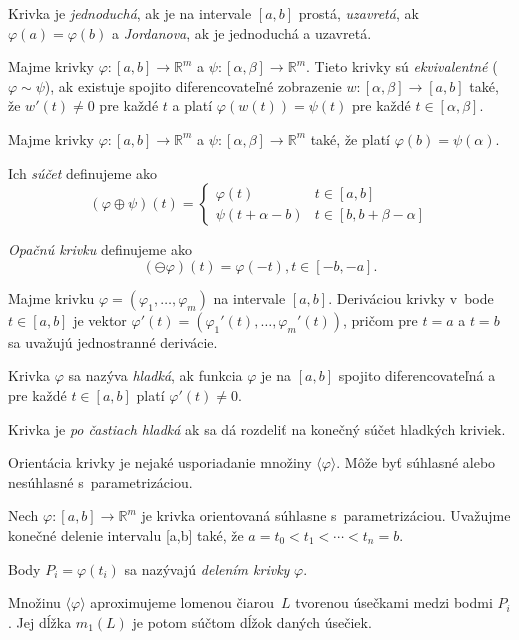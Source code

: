 Krivka je {\em jednoduchá}, ak je na intervale $[a,b]$ prostá,
{\em uzavretá}, ak $\varphi(a)=\varphi(b)$ a {\em Jordanova}, ak
je jednoduchá a uzavretá.

\begin{definition}
	Majme krivky $\varphi: [a,b] \to \mathbb{R}^m$ a 
	$\psi : [\alpha, \beta] \to \mathbb{R}^m$. Tieto krivky
	sú {\em ekvivalentné} ($\varphi \sim \psi$), ak existuje 
	spojito diferencovateľné
	zobrazenie $w : [\alpha, \beta] \to [a,b]$ také, že
	$w'(t) \neq 0$ pre každé $t$ a platí
	$\varphi(w(t)) = \psi(t)$ pre každé $t \in [\alpha, \beta]$.
\end{definition}

\begin{definition}
	Majme krivky $\varphi: [a,b] \to \mathbb{R}^m$ a 
	$\psi : [\alpha, \beta] \to \mathbb{R}^m$ také, že platí
	$\varphi(b)=\psi(\alpha)$.
	
	Ich {\em súčet} definujeme ako 
	\[
		(\varphi \oplus \psi)(t) =
		\begin{cases}
			\varphi(t) & t \in [a,b] \\
			\psi(t+\alpha-b) & t \in [b, b + \beta - \alpha]
		\end{cases}
	\]
	
	{\em Opačnú krivku} definujeme ako
	\[
		(\ominus \varphi)(t) = \varphi(-t), t \in [-b, -a].
	\]
\end{definition}

\begin{definition}
	Majme krivku $\varphi=(\varphi_1, \ldots, \varphi_m)$ na intervale
	$[a,b]$. Deriváciou krivky v~bode $t \in [a,b]$ je vektor
	$\varphi'(t) = (\varphi_1'(t), \ldots, \varphi_m'(t))$, pričom pre $t=a$
	a $t=b$ sa uvažujú jednostranné derivácie.
\end{definition}

\begin{definition}
	Krivka $\varphi$ sa nazýva {\em hladká}, ak funkcia $\varphi$
	je na $[a,b]$ spojito diferencovateľná a pre každé $t \in [a,b]$
	platí $\varphi'(t) \neq 0$.
	
	Krivka je {\em po častiach hladká} ak sa dá rozdeliť na konečný 
	súčet hladkých kriviek.
\end{definition}

Orientácia krivky je nejaké usporiadanie množiny $\langle \varphi \rangle$.
Môže byť súhlasné alebo nesúhlasné s~parametrizáciou.

\begin{definition}
	Nech $\varphi : [a,b] \to \mathbb{R}^m$ je krivka orientovaná
	súhlasne s~parametrizáciou. Uvažujme konečné delenie intervalu [a,b] také, že
	$a=t_0 < t_1 < \cdots < t_n = b$. 
	
	Body $P_i = \varphi(t_i)$ sa nazývajú {\em delením krivky} $\varphi$.
	
	Množinu $\langle \varphi \rangle$ aproximujeme lomenou čiarou~$L$
	tvorenou úsečkami medzi bodmi $P_i$. Jej dĺžka $m_1(L)$ je potom 
	súčtom dĺžok daných úsečiek.
\end{definition}

